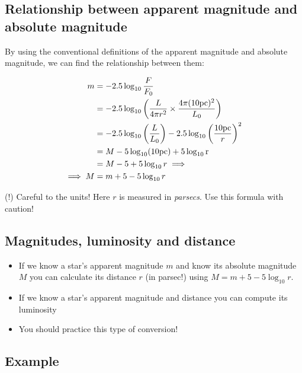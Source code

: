 \documentclass[
  letterpaper,
  DIV=11,
  numbers=noendperiod]{scrreprt}
\providecommand{\tightlist}{%
  \setlength{\itemsep}{0pt}\setlength{\parskip}{0pt}}\usepackage{longtable,booktabs,array}
\begin{document}
\hypertarget{relationship-between-apparent-magnitude-and-absolute-magnitude}{%
\subsection{Relationship between apparent magnitude and absolute
magnitude}\label{relationship-between-apparent-magnitude-and-absolute-magnitude}}

By using the conventional definitions of the apparent magnitude and
absolute magnitude, we can find the relationship between them:

\begin{align}
m &= -2.5\log_{10}{\frac{F}{F_0}} \\
&= -2.5\log_{10}\left(\frac{L}{4\pi r^2}\times \frac{4\pi (10\rm{pc})^2}{L_0} \right) \\
& =-2.5\log_{10}\left(\frac{L}{L_0}\right) -2.5\log_{10} \left( \frac{10\rm{pc}}{r}\right)^2\\
& = M -5\log_{10}(10\rm{pc})+5\log_{10}{r}\\
& = M -5 + 5\log_{10}{r} \implies \\
\implies M &= m + 5 - 5\log_{10} r
\end{align}

(!) Careful to the units! Here \(r\) is measured in \emph{parsecs}. Use
this formula with caution!

\hypertarget{magnitudes-luminosity-and-distance}{%
\subsection{Magnitudes, luminosity and
distance}\label{magnitudes-luminosity-and-distance}}

\begin{itemize}
\tightlist
\item
  If we know a star's apparent magnitude \(m\) and know its absolute
  magnitude \(M\) you can calculate its distance \(r\) (in parsec!)
  using \(M=m + 5 - 5\log_{10} r\).
\item
  If we know a star's apparent magnitude and distance you can compute
  its luminosity
\item
  You should practice this type of conversion!
\end{itemize}

\hypertarget{example-1}{%
\subsection{Example}\label{example-1}}
\end{document}
